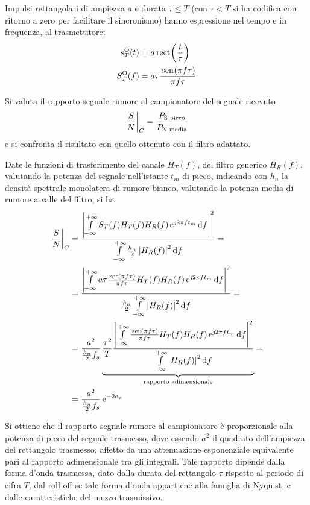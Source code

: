 Impulsi rettangolari di ampiezza $a$ e durata $\tau\leq T$ (con $\tau<T$ si ha codifica con ritorno a zero per facilitare il sincronismo) hanno espressione nel tempo e in frequenza, al trasmettitore:
\begin{equation}
\begin{split}
s_T^\text{O}(t)&=a\,{\operatorname{rect}}^{}\!\left({\frac{t}{\tau}}\right)\\
S_T^\text{O}(f)&=a\tau\frac{\,{\operatorname{sen}}^{}\!\left({\pi f\tau}\right)}{\pi f\tau}
\end{split}
\end{equation}

Si valuta il rapporto segnale rumore al campionatore del segnale ricevuto 
\begin{equation}
\left.{\frac{S}{N}}\right\rvert_{C}=\frac{P_\text{S picco}}{P_\text{N media}}
\end{equation}
e si confronta il risultato con quello ottenuto con il filtro adattato.

Date le funzioni di trasferimento del canale $H_T(f)$, del filtro generico $H_R(f)$, valutando la potenza del segnale nell'istante $t_m$ di picco, indicando con $h_n$ la densità spettrale monolatera di rumore bianco, valutando la potenza media di rumore a valle del filtro, si ha
\begin{equation}
\begin{split}
\restrict{\frac{S}{N}}{C}&=\frac{\abs{\intinf{ S_T(f) H_T(f)H_R(f)\e{\jmath 2\pi f t_m}}{f}}^2}{\intinf{\frac{h_n}{2}\abs{H_R(f)}^2}{f}}=\\
&=\frac{\abs{\intinf{ a\tau \frac{\sen{\pi f\tau}}{\pi f\tau} H_T(f)H_R(f)\e{\jmath 2\pi f t_m}}{f}}^2}{\frac{h_n}{2}\intinf{\abs{H_R(f)}^2}{f}}=\\
&=\frac{a^2}{\frac{h_n}{2}f_s}\underbrace{\frac{\tau^2}{T}\frac{\abs{\intinf{\frac{\sen{\pi f\tau}}{\pi f\tau} H_T(f)H_R(f)\e{\jmath 2\pi f t_m}}{f}}^2}{\intinf{\abs{H_R(f)}^2}{f}}}_{\text{rapporto adimensionale}}=\\
&=\frac{a^2}{\frac{h_n}{2}f_s}\e{-2\alpha_e}
\end{split}
\end{equation}

Si ottiene che il rapporto segnale rumore al campionatore è proporzionale alla potenza di picco del segnale trasmesso, dove essendo $a^2$ il quadrato dell'ampiezza del rettangolo trasmesso, affetto da una attenuazione esponenziale equivalente pari al rapporto adimensionale tra gli integrali. Tale rapporto dipende dalla forma d'onda trasmessa, dato dalla durata del rettangolo $\tau$ rispetto al periodo di cifra $T$, dal roll-off se tale forma d'onda appartiene alla famiglia di Nyquist, e dalle caratteristiche del mezzo trasmissivo.


